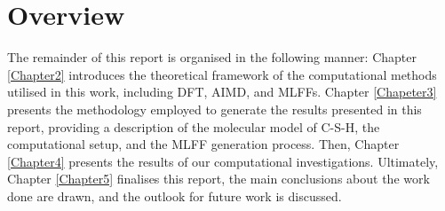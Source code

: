\section{Overview}
The remainder of this report is organised in the following manner: Chapter \ref{Chapter2} introduces the theoretical framework of the computational methods utilised in this work, including DFT, AIMD, and MLFFs. Chapter \ref{Chapeter3} presents the methodology employed to generate the results presented in this report, providing a description of the molecular model of C-S-H, the computational setup, and the MLFF generation process. Then, Chapter \ref{Chapter4} presents the results of our computational investigations. Ultimately, Chapter \ref{Chapter5} finalises this report, the main conclusions about the work done are drawn, and the outlook for future work is discussed.




